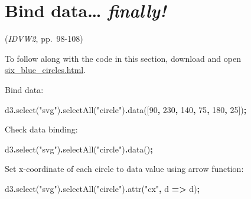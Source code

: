 \documentclass[
  openany]{book}
\newenvironment{Shaded}{\begin{snugshade}}{\end{snugshade}}
\newcommand{\DecValTok}[1]{\textcolor[rgb]{0.00,0.00,0.81}{#1}}
\newcommand{\FunctionTok}[1]{\textcolor[rgb]{0.00,0.00,0.00}{#1}}
\newcommand{\KeywordTok}[1]{\textcolor[rgb]{0.13,0.29,0.53}{\textbf{#1}}}
\newcommand{\NormalTok}[1]{#1}
\newcommand{\OperatorTok}[1]{\textcolor[rgb]{0.81,0.36,0.00}{\textbf{#1}}}
\newcommand{\StringTok}[1]{\textcolor[rgb]{0.31,0.60,0.02}{#1}}
\begin{document}
\protect\hyperlink{d3-in-the-console-blue-circles}{}

\hypertarget{bind-data-finally}{%
\section{\texorpdfstring{Bind data\ldots{} \emph{finally!} }{Bind data\ldots{} finally! }}\label{bind-data-finally}}

(\emph{IDVW2}, pp.~98-108)

To follow along with the code in this section, download and open \href{https://raw.githubusercontent.com/jtr13/d3book/master/code/six_blue_circles.html}{six\_blue\_circles.html}.

Bind data:

\begin{Shaded}
\begin{Highlighting}[]
\NormalTok{d3}\OperatorTok{.}\FunctionTok{select}\NormalTok{(}\StringTok{"svg"}\NormalTok{)}\OperatorTok{.}\FunctionTok{selectAll}\NormalTok{(}\StringTok{"circle"}\NormalTok{)}\OperatorTok{.}\FunctionTok{data}\NormalTok{([}\DecValTok{90}\OperatorTok{,} \DecValTok{230}\OperatorTok{,} \DecValTok{140}\OperatorTok{,} \DecValTok{75}\OperatorTok{,} \DecValTok{180}\OperatorTok{,} \DecValTok{25}\NormalTok{])}\OperatorTok{;}
\end{Highlighting}
\end{Shaded}

Check data binding:

\begin{Shaded}
\begin{Highlighting}[]
\NormalTok{d3}\OperatorTok{.}\FunctionTok{select}\NormalTok{(}\StringTok{"svg"}\NormalTok{)}\OperatorTok{.}\FunctionTok{selectAll}\NormalTok{(}\StringTok{"circle"}\NormalTok{)}\OperatorTok{.}\FunctionTok{data}\NormalTok{()}\OperatorTok{;}
\end{Highlighting}
\end{Shaded}

Set x-coordinate of each circle to data value using arrow function:

\begin{Shaded}
\begin{Highlighting}[]
\NormalTok{d3}\OperatorTok{.}\FunctionTok{select}\NormalTok{(}\StringTok{"svg"}\NormalTok{)}\OperatorTok{.}\FunctionTok{selectAll}\NormalTok{(}\StringTok{"circle"}\NormalTok{)}\OperatorTok{.}\FunctionTok{attr}\NormalTok{(}\StringTok{"cx"}\OperatorTok{,}\NormalTok{ d }\KeywordTok{=\textgreater{}}\NormalTok{ d)}\OperatorTok{;}
\end{Highlighting}
\end{Shaded}
\end{document}
